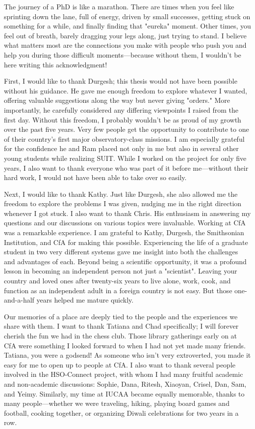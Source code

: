 \noindent
The journey of a PhD is like a marathon. There are times when you feel like sprinting down the lane, full of energy, driven by small successes, getting stuck on something for a while, and finally finding that "eureka" moment. Other times, you feel out of breath, barely dragging your legs along, just trying to stand. I believe what matters most are the connections you make with people who push you and help you during those difficult moments—because without them, I wouldn't be here writing this acknowledgment!  

\noindent
First, I would like to thank Durgesh; this thesis would not have been possible without his guidance. He gave me enough freedom to explore whatever I wanted, offering valuable suggestions along the way but never giving "orders." More importantly, he carefully considered any differing viewpoints I raised from the first day. Without this freedom, I probably wouldn't be as proud of my growth over the past five years. Very few people get the opportunity to contribute to one of their country's first major observatory-class missions. I am especially grateful for the confidence he and Ram placed not only in me but also in several other young students while realizing SUIT. While I worked on the project for only five years, I also want to thank everyone who was part of it before me—without their hard work, I would not have been able to take over so easily.  

\noindent
Next, I would like to thank Kathy. Just like Durgesh, she also allowed me the freedom to explore the problems I was given, nudging me in the right direction whenever I got stuck. I also want to thank Chris. His enthusiasm in answering my questions and our discussions on various topics were invaluable. Working at CfA was a remarkable experience. I am grateful to Kathy, Durgesh, the Smithsonian Institution, and CfA for making this possible. Experiencing the life of a graduate student in two very different systems gave me insight into both the challenges and advantages of each. Beyond being a scientific opportunity, it was a profound lesson in becoming an independent person not just a "scientist". Leaving your country and loved ones after twenty-six years to live alone, work, cook, and function as an independent adult in a foreign country is not easy. But those one-and-a-half years helped me mature quickly.  

\noindent
Our memories of a place are deeply tied to the people and the experiences we share with them. I want to thank Tatiana and Chad specifically; I will forever cherish the fun we had in the chess club. Those library gatherings early on at CfA were something I looked forward to when I had not yet made many friends. Tatiana, you were a godsend! As someone who isn't very extroverted, you made it easy for me to open up to people at CfA. I also want to thank several people involved in the HSO-Connect project, with whom I had many fruitful academic and non-academic discussions: Sophie, Dana, Ritesh, Xiaoyan, Crisel, Dan, Sam, and Yeimy. Similarly, my time at IUCAA became equally memorable, thanks to many people—whether we were traveling, hiking, playing board games and football, cooking together, or organizing Diwali celebrations for two years in a row.  


